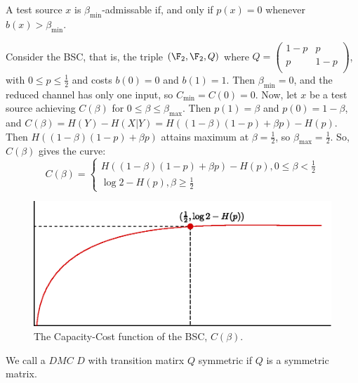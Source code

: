 \begin{lemma}\label{3.1.5}
    A test source $x$ is  $\beta_{\min}$-admissable if, and only if $p(x)=0$
    whenever $b(x)>\beta_{\min}$.
\end{lemma}

\begin{example}
   Consider the BSC, that is, the triple $(\F_2,\F_2,Q)$ where
    $Q=\begin{pmatrix} 1-p & p \\ p & 1-p \\\end{pmatrix}$, with $0 \leq p \leq
    \frac{1}{2}$ and costs $b(0)=0$ and $b(1)=1$. Then $\beta_{\min}=0$, and the
    reduced channel has only one input, so $C_{\min}=C(0)=0$. Now, let $x$ be a
    test source achieving  $C(\beta)$ for $0 \leq \beta \leq \beta_{\max}$. Then
    $p(1)=\beta$ and $p(0)=1-\beta$, and
    $C(\beta)=H(Y)-H(X|Y)=H((1-\beta)(1-p)+\beta p)-H(p)$. Then $H((1-\beta)
    (1-p)+\beta p)$ attains maximum at $\beta=\frac{1}{2}$, so
    $\beta_{\max}=\frac{1}{2}$. So, $C(\beta)$ gives the curve:
    \begin{equation*}
        C(\beta)=\begin{cases}
                H((1-\beta)(1-p)+\beta p)-H(p), 0 \leq \beta < \frac{1}{2} \\
                \log{2}-H(p), \beta \geq \frac{1}{2}
             \end{cases}
    \end{equation*}
    \begin{figure}[h]
        \centering
        \includegraphics[scale=0.5]{Figures/Chapter3/cap_cost_1.eps}
        \caption{The Capacity-Cost function of the BSC, $C(\beta)$.}
        \label{fig_3.1}
    \end{figure}
\end{example}

\begin{definition}
    We call a $DMC$  $D$ with transition matirx $Q$ symmetric if $Q$ is a
    symmetric matrix.
\end{definition}

